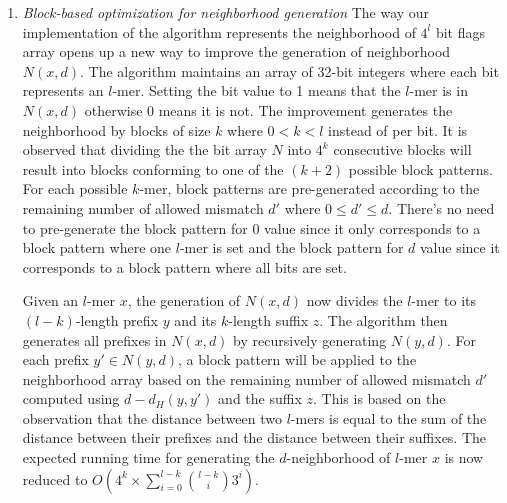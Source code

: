 \begin{enumerate}[label={\em \arabic*.}]
		\item{\em Block-based optimization for neighborhood generation}\newline
			The way our implementation of the algorithm represents the neighborhood of $4^{l}$ bit flags array opens up a new way to improve the generation of neighborhood $N(x, d)$. The algorithm maintains an array of 32-bit integers where each bit represents an $l$-mer. Setting the bit value to 1 means that the $l$-mer is in $N(x, d)$ otherwise 0 means it is not. The improvement generates the neighborhood by blocks of size $k$ where $0 < k < l$ instead of per bit. It is observed that dividing the the bit array $N$ into $4^k$ consecutive blocks will result into blocks conforming to one of the $(k + 2)$ possible block patterns. For each possible $k$-mer, block patterns are pre-generated according to the remaining number of allowed mismatch $d'$ where $0 \le d' \le d$. There's no need to pre-generate the block pattern for 0 value since it only corresponds to a block pattern where one $l$-mer is set and the block pattern for $d$ value since it corresponds to a block pattern where all bits are set. \newline

			Given an $l$-mer $x$, the generation of $N(x, d)$ now divides the $l$-mer to its $(l - k)$-length prefix $y$ and its $k$-length suffix $z$. The algorithm then generates all prefixes in $N(x, d)$ by recursively generating $N(y, d)$. For each prefix $y' \in N(y, d)$, a block pattern will be applied to the neighborhood array based on the remaining number of allowed mismatch $d'$ computed using $d - d_H(y, y')$ and the suffix $z$. This is based on the observation that the distance between two $l$-mers is equal to the sum of the distance between their prefixes and the distance between their suffixes. The expected running time for generating the $d$-neighborhood of $l$-mer $x$ is now reduced to $O(4^{k} \times \sum_{i=0}^{l-k} \binom{l-k}{i} 3^{i})$.

	\end{enumerate}

